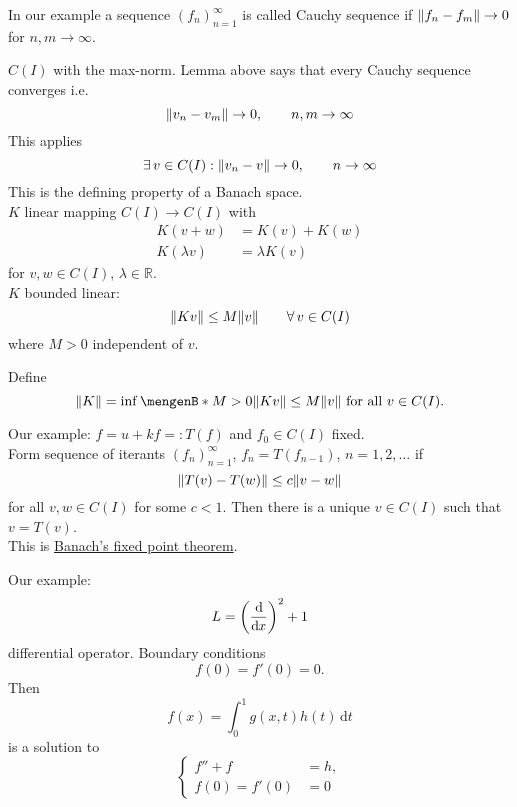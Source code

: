 \begin{definition*}
	In our example a sequence $(f_n)_{n=1}^{\infty}$ is called Cauchy sequence if $\norm{f_n-f_m} \to 0$ for $n,m \to \infty$.
\end{definition*}
\begin{definition*}
	$C(I)$ with the max-norm. Lemma above says that every Cauchy sequence converges i.e.
	\[
		\norm{v_n-v_m} \to 0, \qquad n,m \to \infty
	\]
	This applies
	\[
		\exists\, v \in C(I): \norm{v_n-v} \to 0, \qquad n \to \infty
	\]
	This is the defining property of a Banach space. \\
	$K$ linear mapping $C(I) \to C(I)$ with
	\begin{align*}
		K(v+w) &= K(v) + K(w) \\
		K(\lambda v) &= \lambda K(v)
	\end{align*}
	for $v,w \in  C(I)$, $\lambda \in \mathbb{R}$. \\
	$K$ bounded linear:
	\[
		\norm{Kv} \leq M \norm{v} \qquad \forall\, v \in C(I)
	\]
	where $M >0$ independent of $v$.	
\end{definition*}
\begin{definition*}
	Define
	\[
		\norm{K}= \inf \set[M>0]{\norm{Kv} \leq M \norm{v} \text{ for all }v \in C(I)}.
	\]
\end{definition*}
Our example: $f=u+kf =: T(f)$ and $f_0 \in C(I)$ fixed. \\
Form sequence of iterants $(f_n)_{n=1}^{\infty}$, $f_n = T(f_{n-1})$, $n=1,2,\dots$ if
\[
	\norm{T(v)-T(w)} \leq c \norm{v-w}
\]
for all $v,w \in C(I)$ for some $c<1$. Then there is a unique $v \in C(I)$ such that $v = T(v)$. \\
This is \underline{Banach's fixed point theorem}.
\begin{definition*}
	Our example: 
	\[
		L = \left( \frac{\mathrm{d}\mkern-1.0mu }{\mathrm{d}\mkern-1.0mu x}  \right)^2 + 1 
	\]
	differential operator. Boundary conditions 
	\[
		f(0) = f'(0) = 0.
	\]
	Then 
	\[
		f(x) = \int_{0}^{1} g(x,t)h(t) \,\mathrm{d}t 
	\]
	is a solution to
	\[
		\begin{cases}
			f''+f &= h, \\
			f(0) = f'(0)& = 0	
		\end{cases}
	\]
\end{definition*}
